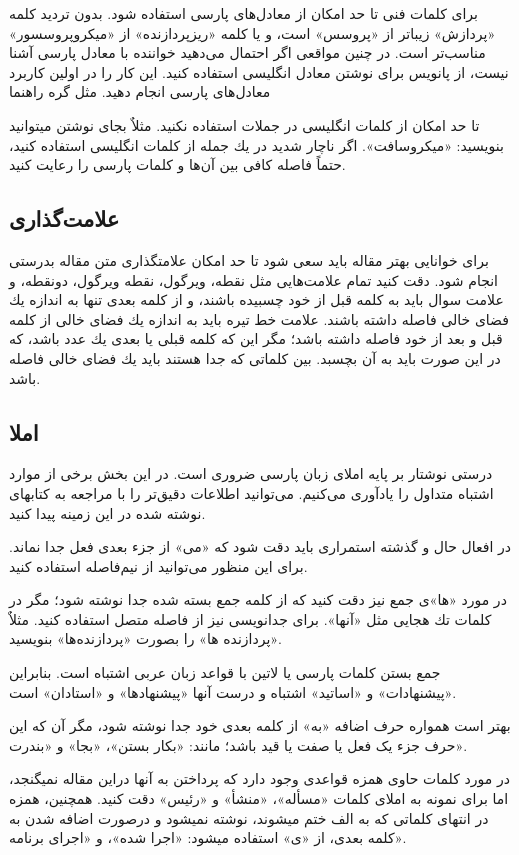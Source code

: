 \documentclass{CSICC2016}
\begin{document}
برای كلمات فنی تا حد امكان از معادل‌های پارسی استفاده شود. بدون تردید كلمه «پردازش» زیباتر از «پروسس» است، و یا كلمه «ریزپردازنده» از «میكروپروسسور» مناسب‌تر است. در چنین مواقعی اگر احتمال می‌دهید خواننده با معادل پارسی آشنا نیست، از پانویس برای نوشتن معادل انگلیسی استفاده كنید. این كار را در اولین كاربرد معادل‌های پارسی انجام دهید. مثل گره راهنما

تا حد امكان از كلمات انگلیسی در جملات استفاده نكنید. مثلاٌ بجای نوشتن  می­توانید بنویسید: «میكروسافت». اگر ناچار شدید در یك جمله از كلمات انگلیسی استفاده كنید، حتماً فاصله كافی بین آن‌ها و كلمات پارسی را رعایت كنید.

\subsection{علامت‌گذاری}
برای خوانایی بهتر مقاله باید سعی شود تا حد امكان علامت­گذاری متن مقاله بدرستی انجام شود. دقت كنید تمام علامت‌هایی مثل نقطه، ویرگول، نقطه ویرگول، دونقطه، و علامت سوال باید به كلمه قبل از خود چسبیده باشند، و از كلمه بعدی تنها به اندازه یك فضای خالی فاصله داشته باشند. علامت خط تیره باید به اندازه یك فضای خالی از كلمه قبل و بعد از خود فاصله داشته باشد؛ مگر این كه كلمه قبلی یا بعدی یك عدد باشد، كه در این صورت باید به آن بچسبد. بین كلماتی كه جدا هستند باید یك فضای خالی فاصله باشد.
\subsection{املا}
درستی نوشتار بر پایه املای زبان پارسی ضروری است. در این بخش برخی از موارد اشتباه متداول را یادآوری می‌كنیم. می‌توانید اطلاعات دقیق‌تر را با مراجعه به كتاب­های نوشته شده در این زمینه پیدا كنید.

در افعال حال و گذشته استمراری باید دقت شود كه «می» از جزء بعدی فعل جدا نماند. برای این منظور می‌توانید از نیم‌فاصله استفاده کنید.

در مورد «ها»ی جمع نیز دقت كنید كه از كلمه جمع بسته شده جدا نوشته شود؛ مگر در كلمات تك هجایی مثل «آنها». برای جدانویسی نیز از فاصله متصل استفاده كنید. مثلاٌ «پردازنده ها» را بصورت «پردازنده‌­ها» بنویسید.

جمع بستن كلمات پارسی یا لاتین با قواعد زبان عربی اشتباه است. بنابراین «پیشنهادات» و «اساتید» اشتباه و درست آنها «پیشنهادها» و «استادان» است.

بهتر است همواره حرف اضافه «به» از کلمه بعدی خود جدا نوشته شود، مگر آن که این حرف جزء یک فعل یا صفت یا قید باشد؛ مانند: «بکار بستن»، «بجا» و «بندرت».

در مورد کلمات حاوی همزه قواعدی وجود دارد که پرداختن به آنها دراین مقاله نمی­گنجد، اما برای نمونه به املای کلمات «مسأله»، «منشأ» و «رئیس» دقت كنید. همچنین، همزه در انتهای کلماتی که به الف ختم می­شوند، نوشته نمی­شود و درصورت اضافه شدن به کلمه بعدی، از «ی» استفاده می­شود: «اجرا شده»، و «اجرای برنامه».
\end{document}
